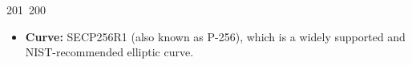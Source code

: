 201~200~\documentclass{article}
\begin{document}
	                                                                                                                                                                                                                                                                                                	                                                                                                                                        	    	                                                                                                	                                                                                                                                                                                                                                                                                                                                	                                                                        	                                                                        	                                                                                                                                        	                                                                                                                                                \begin{itemize}
	                                                                                                                                                                                                                                                                                                	                                                                                                                                        	    	                                                                                                	                                                                                                                                                                                                                                                                                                                                	                                                                        	                                                                        	                                                                                                                                        	                                                                                                                                                    \item \textbf{Curve:} SECP256R1 (also known as P-256), which is a widely supported and NIST-recommended elliptic curve.

\end{itemize}
\end{document}
